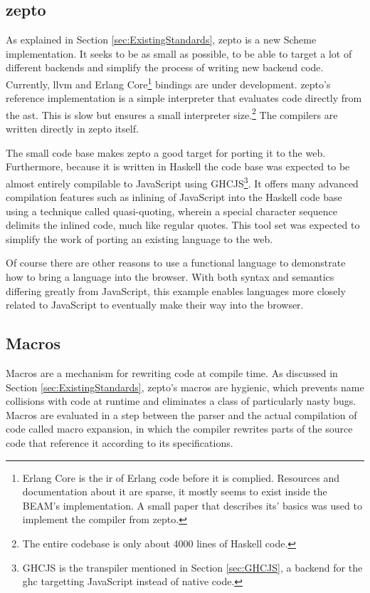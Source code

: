 \documentclass[oneside,11pt,xetex]{scrbook}
\begin{document}
\subsection{zepto}
\label{ququ}

As explained in Section \ref{sec:ExistingStandards}, zepto is a new Scheme implementation. It seeks
to be as small as possible, to be able to target a lot of different backends and simplify the
process of writing new backend code. Currently, \gls{llvm} and Erlang Core\footnote{Erlang Core 
is the \gls{ir} of Erlang code before it is complied. Resources and documentation
about it are sparse, it mostly seems to exist inside the BEAM's implementation. A small
paper \parencite{ERL} that describes its' basics was used to implement the compiler from
zepto.} bindings are under development. zepto's reference implementation is a simple interpreter
that evaluates code directly from the \gls{ast}. This is slow but ensures a small
interpreter size.\footnote{The entire codebase is only about 4000 lines of Haskell code.}
The compilers are written directly in zepto itself.

The small code base makes zepto a good target for porting it to the web. Furthermore, because
it is written in Haskell the code base was expected to be almost entirely compilable
to JavaScript using GHCJS\footnote{GHCJS is the transpiler mentioned in Section \ref{sec:GHCJS},
a backend for the \gls{ghc} targetting JavaScript instead of native code.}. It offers many
advanced compilation features such as inlining of JavaScript into the Haskell code
base using a technique called quasi-quoting, wherein a special character sequence delimits the
inlined code, much like regular quotes. This tool set was expected to simplify the work of
porting an existing language to the web.

Of course there are other reasons to use a functional language to demonstrate how to
bring a language into the browser. With both syntax
and semantics differing greatly from JavaScript, this example enables languages more
closely related to JavaScript to eventually make their way into the browser.

\subsection{Macros}
\label{macro}

Macros are a mechanism for rewriting code at compile time. As discussed in
Section \ref{sec:ExistingStandards}, zepto's macros are hygienic, which prevents name collisions
with code at runtime and eliminates a class of particularly nasty bugs. Macros are
evaluated in a step between the parser and the actual compilation of code
called macro expansion, in which the compiler rewrites parts of the source code that reference
it according to its specifications.
\end{document}

